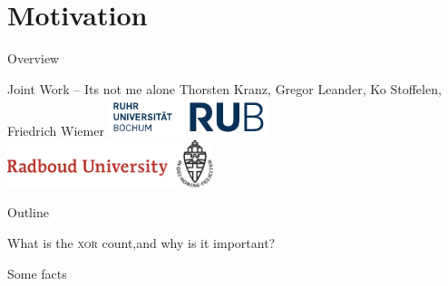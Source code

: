 \section{Motivation}
\begin{frame}{Overview}{}
    \begin{block}{Joint Work -- Its not me alone}
        \centering
        Thorsten Kranz, Gregor Leander, Ko Stoffelen, Friedrich Wiemer
        \includegraphics[width=0.35\textwidth]{data/logo_rub}
        \hspace{2em}
        \includegraphics[width=0.45\textwidth]{data/ru_en_branding}
    \end{block}
    \begin{block}{Outline}
        \vspace{0.5em}
        \tableofcontents
    \end{block}
\end{frame}

\begin{frame}{What is the \textsc{xor} count,}{and why is it important?}
    \begin{block}{Some facts}
    \begin{itemize}
    \end{itemize}
    \begin{itemize}
    \end{itemize}
    \end{block}
\end{frame}

